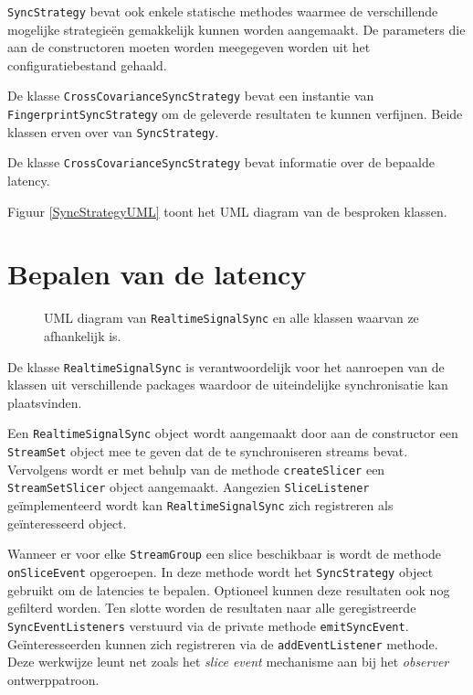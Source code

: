 \texttt{SyncStrategy} bevat ook enkele statische methodes waarmee de verschillende mogelijke strategieën gemakkelijk kunnen worden aangemaakt. De parameters die aan de constructoren moeten worden meegegeven worden uit het configuratiebestand gehaald. 

De klasse \texttt{CrossCovarianceSyncStrategy} bevat een instantie van \texttt{FingerprintSyncStrategy} om de geleverde resultaten te kunnen verfijnen. Beide klassen erven over van \texttt{SyncStrategy}.

De klasse \texttt{CrossCovarianceSyncStrategy} bevat informatie over de bepaalde latency.

Figuur \ref{SyncStrategyUML} toont het UML diagram van de besproken klassen.

\section*{Bepalen van de latency}

\begin{figure}[h!]
	\captionsetup{width=0.7\textwidth}
	\caption[UML diagram van \texttt{RealtimeSignalSync} + afhankelijkheden]{UML diagram van \texttt{RealtimeSignalSync} en alle klassen waarvan ze afhankelijk is.}
	\begin{center}
		\advance\parskip0.3cm
		
	\end{center}
	\label{latencyUML}
\end{figure}

De klasse \texttt{RealtimeSignalSync} is verantwoordelijk voor het aanroepen van de klassen uit verschillende packages waardoor de uiteindelijke synchronisatie kan plaatsvinden.

Een \texttt{RealtimeSignalSync} object wordt aangemaakt door aan de constructor een \texttt{StreamSet} object mee te geven dat de te synchroniseren streams bevat. Vervolgens wordt er met behulp van de methode \texttt{createSlicer} een \texttt{StreamSetSlicer} object aangemaakt. Aangezien \texttt{SliceListener} geïmplementeerd wordt kan \texttt{RealtimeSignalSync} zich registreren als geïnteresseerd object.

Wanneer er voor elke \texttt{StreamGroup} een slice beschikbaar is wordt de methode \texttt{onSliceEvent} opgeroepen. In deze methode wordt het \texttt{SyncStrategy} object gebruikt om de latencies te bepalen. Optioneel kunnen deze resultaten ook nog gefilterd worden. Ten slotte worden de resultaten naar alle geregistreerde \texttt{SyncEventListeners} verstuurd via de private methode \texttt{emitSyncEvent}. Geïnteresseerden kunnen zich registreren via de \texttt{addEventListener} methode. Deze werkwijze leunt net zoals het \textit{slice event} mechanisme aan bij het \textit{observer} ontwerppatroon.

